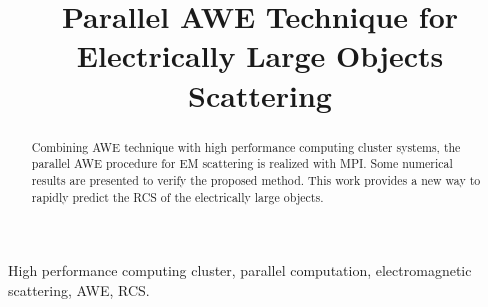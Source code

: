 \documentclass[conference, a4paper]{IEEEtran}
\begin{document}
\title{Parallel AWE Technique for Electrically Large Objects
Scattering}





% 
\author{
}




\maketitle

\begin{abstract}
Combining AWE technique with high performance 
computing cluster systems, the parallel AWE procedure 
for EM scattering is realized with MPI. Some numerical results are presented 
to verify the proposed method. This work provides a new way to rapidly 
predict the RCS of the electrically large objects.
\end{abstract}
\begin{keywords}
High performance computing cluster, 
parallel computation, electromagnetic scattering, AWE, RCS.
\end{keywords}
\end{document}
